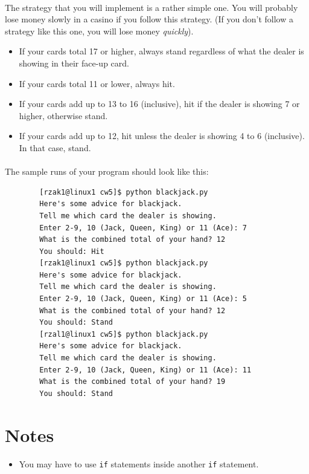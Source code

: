 \documentclass[letter,10pt]{article}
\begin{document}
    \paragraph{}The strategy that you will implement is a rather simple one. You will probably lose money slowly in a casino if you follow this strategy. (If you don't follow a strategy like this one, you will lose money \textit{quickly}).
    \begin{itemize}
        \item If your cards total 17 or higher, always stand regardless of what the dealer is showing in their face-up card.
        \item If your cards total 11 or lower, always hit.
        \item If your cards add up to 13 to 16 (inclusive), hit if the dealer is showing 7 or higher, otherwise stand.
        \item If your cards add up to 12, hit unless the dealer is showing 4 to 6 (inclusive). In that case, stand.
    \end{itemize}
    
    \paragraph{}The sample runs of your program should look like this:
    \begin{verbatim}
        [rzak1@linux1 cw5]$ python blackjack.py
        Here's some advice for blackjack.
        Tell me which card the dealer is showing.
        Enter 2-9, 10 (Jack, Queen, King) or 11 (Ace): 7
        What is the combined total of your hand? 12
        You should: Hit
        [rzak1@linux1 cw5]$ python blackjack.py
        Here's some advice for blackjack.
        Tell me which card the dealer is showing.
        Enter 2-9, 10 (Jack, Queen, King) or 11 (Ace): 5
        What is the combined total of your hand? 12
        You should: Stand
        [rzal1@linux1 cw5]$ python blackjack.py
        Here's some advice for blackjack.
        Tell me which card the dealer is showing.
        Enter 2-9, 10 (Jack, Queen, King) or 11 (Ace): 11
        What is the combined total of your hand? 19
        You should: Stand
    \end{verbatim}
    
    \section*{Notes}
    \begin{itemize}
        \item You may have to use \texttt{if} statements inside another \texttt{if} statement.
    \end{itemize}
    
\end{document}
